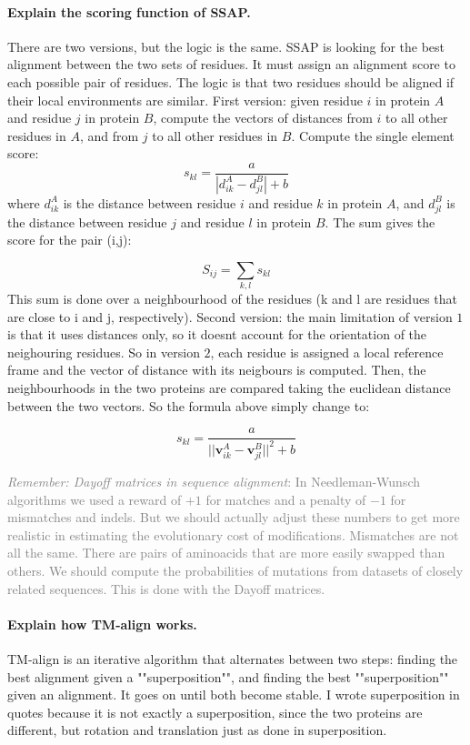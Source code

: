 \paragraph{Explain the scoring function of SSAP. \done}
There are two versions, but the logic is the same. SSAP is looking for the best alignment between the two sets of residues.
It must assign an alignment score to each possible pair of residues. The logic is that two residues 
should be aligned if their local environments are similar.
\medskip \newline \noindent
First version: given residue $i$ in protein $A$ and residue $j$ in protein $B$, compute the vectors of distances from $i$ to all other residues in $A$, and from $j$ to all other residues in $B$. 
Compute the single element score:
$$
s_{kl}=\frac{a}{|d^A_{ik}-d^B_{jl}|+b}
$$
where $d^A_{ik}$ is the distance between residue $i$ and residue $k$ in protein $A$, and $d^B_{jl}$ is the distance between residue $j$ and residue $l$ in protein $B$. The sum gives the score for the pair (i,j):

$$
S_{ij}=\sum_{k,l} s_{kl}
$$
This sum is done over a neighbourhood of the residues (k and l are residues that are close to i and j, respectively).
\medskip \newline \noindent
Second version: the main limitation of version $1$ is that it uses distances only, so it doesnt account for the orientation of the neighouring residues. So in version $2$,
each residue is assigned a local reference frame and the vector of distance with its neigbours is computed.
Then, the neighbourhoods in the two proteins are compared taking the euclidean distance between the two vectors. So the formula above simply change to:

$$
s_{kl}=\frac{a}{||\mathbf{v}^A_{ik}-\mathbf{v}^B_{jl}||^2+b}
$$

\medskip \noindent
\textcolor{gray}{\textit{Remember: Dayoff matrices in sequence alignment}: In Needleman-Wunsch algorithms we used a reward of $+1$ for matches and a
penalty of $-1$ for mismatches and indels. But we should actually adjust these numbers to get
more realistic in estimating the evolutionary cost of modifications. Mismatches are not all the same. There are pairs of aminoacids that are more easily
swapped than others. We should compute the probabilities of mutations from datasets
of closely related sequences. This is done with the Dayoff matrices.}


\paragraph{Explain how TM-align works. \done}
TM-align is an iterative algorithm that alternates between two steps: finding the best alignment given a ""superposition"", and finding the best ""superposition"" given an alignment. It goes on until both become stable. I wrote
superposition in quotes because it is not exactly a superposition, since the two proteins are different, but rotation and translation just as done in superposition.

